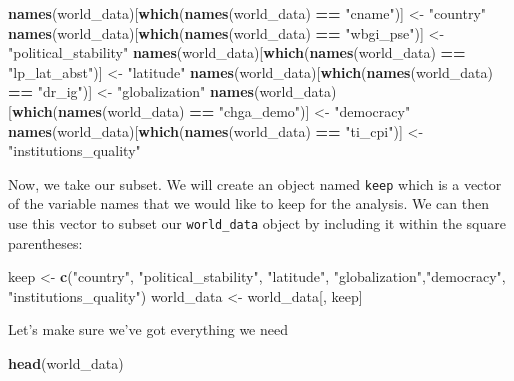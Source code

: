 \documentclass[]{article}
\newenvironment{Shaded}{\begin{snugshade}}{\end{snugshade}}
\newcommand{\KeywordTok}[1]{\textcolor[rgb]{0.13,0.29,0.53}{\textbf{#1}}}
\newcommand{\StringTok}[1]{\textcolor[rgb]{0.31,0.60,0.02}{#1}}
\newcommand{\OperatorTok}[1]{\textcolor[rgb]{0.81,0.36,0.00}{\textbf{#1}}}
\newcommand{\NormalTok}[1]{#1}
\theoremstyle{definition}
\theoremstyle{definition}
\theoremstyle{definition}
\theoremstyle{remark}
\begin{document}
\begin{Shaded}
\begin{Highlighting}[]
\KeywordTok{names}\NormalTok{(world_data)[}\KeywordTok{which}\NormalTok{(}\KeywordTok{names}\NormalTok{(world_data) }\OperatorTok{==}\StringTok{ "cname"}\NormalTok{)] <-}\StringTok{ "country"}
\KeywordTok{names}\NormalTok{(world_data)[}\KeywordTok{which}\NormalTok{(}\KeywordTok{names}\NormalTok{(world_data) }\OperatorTok{==}\StringTok{ "wbgi_pse"}\NormalTok{)] <-}\StringTok{ "political_stability"}
\KeywordTok{names}\NormalTok{(world_data)[}\KeywordTok{which}\NormalTok{(}\KeywordTok{names}\NormalTok{(world_data) }\OperatorTok{==}\StringTok{ "lp_lat_abst"}\NormalTok{)] <-}\StringTok{ "latitude"}
\KeywordTok{names}\NormalTok{(world_data)[}\KeywordTok{which}\NormalTok{(}\KeywordTok{names}\NormalTok{(world_data) }\OperatorTok{==}\StringTok{ "dr_ig"}\NormalTok{)] <-}\StringTok{ "globalization"}
\KeywordTok{names}\NormalTok{(world_data)[}\KeywordTok{which}\NormalTok{(}\KeywordTok{names}\NormalTok{(world_data) }\OperatorTok{==}\StringTok{ "chga_demo"}\NormalTok{)] <-}\StringTok{ "democracy"}
\KeywordTok{names}\NormalTok{(world_data)[}\KeywordTok{which}\NormalTok{(}\KeywordTok{names}\NormalTok{(world_data) }\OperatorTok{==}\StringTok{ "ti_cpi"}\NormalTok{)] <-}\StringTok{ "institutions_quality"}
\end{Highlighting}
\end{Shaded}

Now, we take our subset. We will create an object named \texttt{keep}
which is a vector of the variable names that we would like to keep for
the analysis. We can then use this vector to subset our
\texttt{world\_data} object by including it within the square
parentheses:

\begin{Shaded}
\begin{Highlighting}[]
\NormalTok{keep <-}\StringTok{ }\KeywordTok{c}\NormalTok{(}\StringTok{"country"}\NormalTok{, }\StringTok{"political_stability"}\NormalTok{, }\StringTok{"latitude"}\NormalTok{, }\StringTok{"globalization"}\NormalTok{,}\StringTok{"democracy"}\NormalTok{, }\StringTok{"institutions_quality"}\NormalTok{)}
\NormalTok{world_data <-}\StringTok{ }\NormalTok{world_data[, keep]}
\end{Highlighting}
\end{Shaded}

Let's make sure we've got everything we need

\begin{Shaded}
\begin{Highlighting}[]
\KeywordTok{head}\NormalTok{(world_data)}
\end{Highlighting}
\end{Shaded}
\end{document}
